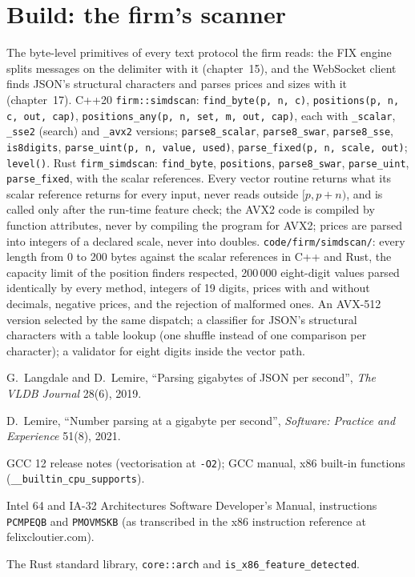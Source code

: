 \section{Build: the firm's scanner}\label{bld:ll:vector-instructions-and-data-parallel-code:simdscan}

\begin{build}
 The byte-level primitives of every text protocol the firm reads: the FIX engine splits messages on the
delimiter with it (chapter~15), and the WebSocket client finds JSON's structural characters and parses prices and sizes with
it (chapter~17).
 C++20 \texttt{firm::simdscan}: \texttt{find\_byte(p, n, c)}, \texttt{positions(p, n, c, out, cap)},
\texttt{positions\_any(p, n, set, m, out, cap)}, each with \texttt{\_scalar}, \texttt{\_sse2} (search) and \texttt{\_avx2}
versions; \texttt{parse8\_scalar}, \texttt{parse8\_swar}, \texttt{parse8\_sse}, \texttt{is8digits},
\texttt{parse\_uint(p, n, value, used)}, \texttt{parse\_fixed(p, n, scale, out)}; \texttt{level()}. Rust
\texttt{firm\_simdscan}: \texttt{find\_byte}, \texttt{positions}, \texttt{parse8\_swar}, \texttt{parse\_uint},
\texttt{parse\_fixed}, with the scalar references.
 Every vector routine returns what its scalar reference returns for every input, never reads outside
$[p, p+n)$, and is called only after the run-time feature check; the AVX2 code is compiled by function attributes, never by
compiling the program for AVX2; prices are parsed into integers of a declared scale, never into doubles.
 \texttt{code/firm/simdscan/}: every length from 0 to 200 bytes against the scalar references in
C++ and Rust, the capacity limit of the position finders respected, 200\,000 eight-digit values parsed identically by every
method, integers of 19 digits, prices with and without decimals, negative prices, and the rejection of malformed ones.
 An AVX-512 version selected by the same dispatch; a classifier for JSON's structural characters with a
table lookup (one shuffle instead of one comparison per character); a validator for eight digits inside the vector path.
\end{build}

\begin{omsources}
\item G.~Langdale and D.~Lemire, ``Parsing gigabytes of JSON per second'', \emph{The VLDB Journal} 28(6), 2019.
\item D.~Lemire, ``Number parsing at a gigabyte per second'', \emph{Software: Practice and Experience} 51(8), 2021.
\item GCC 12 release notes (vectorisation at \texttt{-O2}); GCC manual, x86 built-in functions
(\texttt{\_\_builtin\_cpu\_supports}).
\item Intel 64 and IA-32 Architectures Software Developer's Manual, instructions \texttt{PCMPEQB} and \texttt{PMOVMSKB} (as
transcribed in the x86 instruction reference at felixcloutier.com).
\item The Rust standard library, \texttt{core::arch} and \texttt{is\_x86\_feature\_detected}.
\end{omsources}

